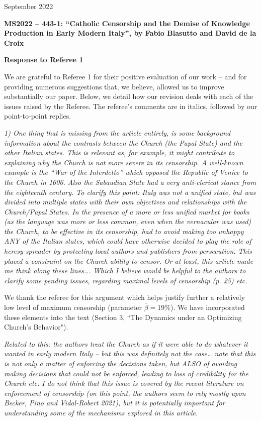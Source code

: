 \documentclass[12pt]{article}
\begin{document}
\hfill September 2022

\textbf{MS2022 – 443-1: “Catholic Censorship and the Demise of Knowledge Production in
Early Modern Italy”, by Fabio Blasutto and David de la Croix}

\textbf{Response to Referee 1}


We are  grateful to Referee 1 for their positive evaluation of our work – and
for providing numerous suggestions that, we believe, allowed us to improve substantially our
paper. Below, we detail how our revision deals with each of the issues raised by the Referee.
The referee’s comments are in italics, followed by our point-to-point replies.

\textit{
1) One thing that is missing from the article entirely, is some background information about the contrasts between the Church (the Papal State) and the other Italian states. This is relevant as, for example, it might contribute to explaining why the Church is not more severe in its censorship. A well-known example is the “War of the Interdetto” which opposed the Republic of Venice to the Church in 1606. Also the Sabaudian State had a very anti-clerical stance from the eighteenth century. To clarify this point: Italy was not a unified state, but was divided into multiple states with their own objectives and relationships with the Church/Papal States. In the presence of a more or less unified market for books (as the language was more or less common, even when the vernacular was used) the Church, to be effective in its censorship, had to avoid making too unhappy ANY of the Italian states, which could have otherwise decided to play the role of heresy-spreader by protecting local authors and publishers from persecution. This placed a constraint on the Church ability to censor. Or at least, this article made me think along these lines…. Which I believe would be helpful to the authors to clarify some pending issues, regarding maximal levels of censorship (p. 25) etc.
}

We thank the referee for this argument which helps justify further a relatively low level of maximum censorship (parameter $\overline{\beta}=19\%$). We have incorporated these elements into the text (Section 3, ``The Dynamics under an Optimizing Church's Behavior").

\textit{
Related to this: the authors treat the Church as if it were able to do whatever it wanted in early modern Italy – but this was definitely not the case…  note that this is not only a matter of enforcing the decisions taken, but ALSO of avoiding making decisions that could not be enforced, leading to loss of credibility for the Church etc. I do not think that this issue is covered by the recent literature on enforcement of censorship (on this point, the authors seem to rely mostly upon Becker, Pino and Vidal-Robert 2021), but it is potentially important for understanding some of the mechanisms explored in this article.
}
\end{document}
